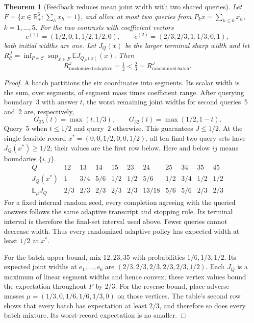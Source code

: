 \documentclass[12pt]{article}
\newtheorem{theorem}{Theorem}
\begin{document}
\begin{theorem}[Feedback reduces mean joint width with two shared queries]
\label{thm:shared-prefix-separation}
Let $F=\{x\in\mathbb R_+^6:\sum_hx_h=1\}$, and allow at most two
queries from $P_kx=\sum_{h\leq k}x_h$, $k=1,\ldots,5$.  For the two
contrasts with coefficient vectors
\[
 c^{(1)}=(1/2,0,1,1/2,1/2,0),\qquad
 c^{(2)}=(2/3,2/3,1,1/3,0,1),
\]
both initial widths are one.  Let $J_Q(x)$ be the larger terminal sharp
width and let $R^J_{\mathcal C}=\inf_{P\in\mathcal C}\sup_{x\in F}
\mathbb E J_{Q_P(x)}(x)$.  Then
\[
 R^J_{\mathrm{randomized\ adaptive}}=\tfrac12
 <\tfrac23=R^J_{\mathrm{randomized\ batch}}.
\]
\end{theorem}
\begin{proof}
A batch partitions the six coordinates into segments.  Its scalar width
is the sum, over segments, of segment mass times coefficient range.
After querying boundary~3 with answer $t$, the worst remaining joint
widths for second queries~5 and~2 are, respectively,
\[
 G_{35}(t)=\max(t,1/3),\qquad
 G_{32}(t)=\max(1/2,1-t).
\]
Query~5 when $t\leq1/2$ and query~2 otherwise.  This guarantees $J\leq1/2$.
At the single feasible record $x^*=(0,0,1/2,0,0,1/2)$, all ten final
two-query sets have $J_Q(x^*)\geq1/2$; their values are the first row below.
Here and below $ij$ means boundaries $\{i,j\}$.
\[
\begin{array}{c|cccccccccc}
Q&12&13&14&15&23&24&25&34&35&45\\\hline
J_Q(x^*)&1&3/4&5/6&1/2&1/2&5/6&1/2&3/4&1/2&1/2\\
\mathbb E_\mu J_Q&2/3&2/3&2/3&2/3&2/3&13/18&5/6&5/6&2/3&2/3
\end{array}
\]
For a fixed internal random seed, every completion agreeing with the
queried answers follows the same adaptive transcript and stopping rule.
Its terminal interval is therefore the final-set interval used above.
Fewer queries cannot decrease width.  Thus every randomized adaptive
policy has expected width at least $1/2$ at $x^*$.

For the batch upper bound, mix $12,23,35$ with probabilities
$1/6,1/3,1/2$.  Its expected joint widths at $e_1,\ldots,e_6$ are
$(2/3,2/3,2/3,2/3,2/3,1/2)$.  Each $J_Q$ is a maximum of linear segment
widths and hence convex; these vertex values bound the expectation
throughout $F$ by $2/3$.  For the reverse bound, place adverse masses
$\mu=(1/3,0,1/6,1/6,1/3,0)$ on those vertices.  The table's second row
shows that every batch has expectation at least $2/3$, and therefore so
does every batch mixture.  Its worst-record expectation is no smaller.
\end{proof}
\end{document}

